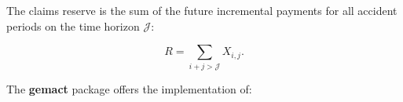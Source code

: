\documentclass{article}
\begin{document}
The claims reserve is the sum of the future incremental payments for all accident periods on the time horizon $\mathcal{J}$:

\begin{equation}
    R = \sum_{i+j>\mathcal{J}}X_{i,j}.
\end{equation}




The \textbf{gemact} package offers the implementation of:
\end{document}
